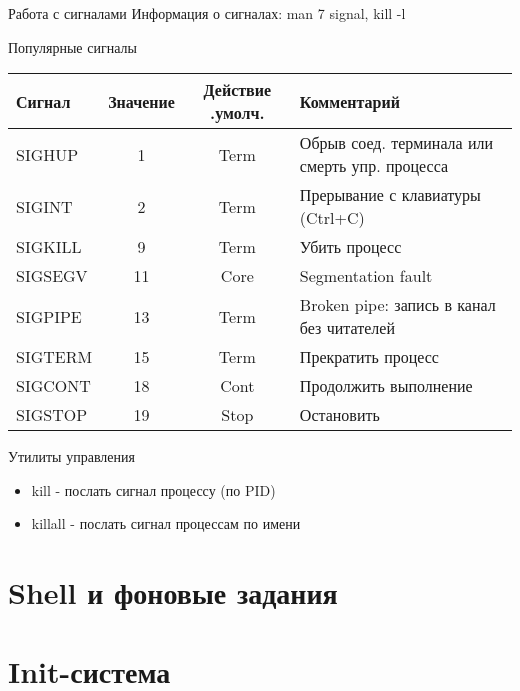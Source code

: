 \begin{frame}[fragile]{Работа с сигналами}
  \small Информация о сигналах: \alert{man 7 signal}, \alert{kill -l}
  \begin{block}{Популярные сигналы}
    \tiny
    \begin{tabular}{l|c|c|l}
      Сигнал & Значение & Действие
      .умолч.& Комментарий \\ \hline 
      SIGHUP &    1     &  Term   &  Обрыв соед. терминала или смерть упр. процесса \\
      SIGINT &    2     &  Term   & Прерывание с клавиатуры (Ctrl+C) \\
      SIGKILL &   9     &  Term   & Убить процесс \\
      SIGSEGV &   11    &  Core   & Segmentation fault \\
      SIGPIPE &   13    &  Term   & Broken pipe: запись в канал без читателей\\
      SIGTERM &   15    &  Term   & Прекратить процесс \\
      SIGCONT &   18    &  Cont   & Продолжить выполнение \\
      SIGSTOP &   19    &  Stop   & Остановить 
    \end{tabular}
  \end{block} \pause

  \begin{block}{Утилиты управления}
    \begin{itemize}
      \item \alert{kill} - послать сигнал процессу (по PID)
      \item \alert{killall} - послать сигнал процессам по имени
    \end{itemize}
  \end{block}

\end{frame}

\section{Shell и фоновые задания}

\section{Init-система}


